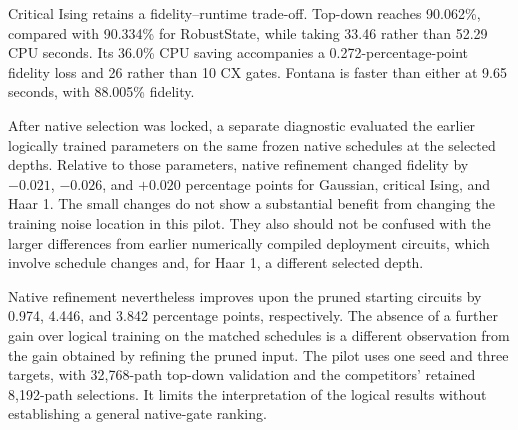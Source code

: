 Critical Ising retains a fidelity--runtime trade-off. Top-down reaches
90.062\%, compared with 90.334\% for RobustState, while taking 33.46
rather than 52.29 CPU seconds. Its 36.0\% CPU saving accompanies a
0.272-percentage-point fidelity loss and 26 rather than 10 CX gates.
Fontana is faster than either at 9.65 seconds, with 88.005\% fidelity.

After native selection was locked, a separate diagnostic evaluated the
earlier logically trained parameters on the same frozen native schedules
at the selected depths. Relative to those parameters, native refinement
changed fidelity by $-0.021$, $-0.026$, and $+0.020$ percentage points for
Gaussian, critical Ising, and Haar 1. The small changes do not show a
substantial benefit from changing the training noise location in this
pilot. They also should not be confused with the larger differences from
earlier numerically compiled deployment circuits, which involve schedule
changes and, for Haar 1, a different selected depth.

Native refinement nevertheless improves upon the pruned starting circuits
by 0.974, 4.446, and 3.842 percentage points, respectively. The absence of
a further gain over logical training on the matched schedules is a
different observation from the gain obtained by refining the pruned input.
The pilot uses one seed and three targets, with 32,768-path top-down
validation and the competitors' retained 8,192-path selections. It limits
the interpretation of the logical results without establishing a general
native-gate ranking.
